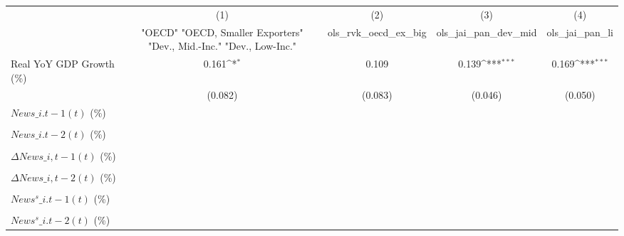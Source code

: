 {
\def\sym#1{\ifmmode^{#1}\else\(^{#1}\)\fi}
\begin{tabular}{l*{4}{c}}
\toprule
                    &\multicolumn{1}{c}{(1)}&\multicolumn{1}{c}{(2)}&\multicolumn{1}{c}{(3)}&\multicolumn{1}{c}{(4)}\\
                    &\multicolumn{1}{c}{ "OECD" "OECD, Smaller Exporters" "Dev., Mid.-Inc." "Dev., Low-Inc."}&\multicolumn{1}{c}{ols\_rvk\_oecd\_ex\_big}&\multicolumn{1}{c}{ols\_jai\_pan\_dev\_mid}&\multicolumn{1}{c}{ols\_jai\_pan\_li}\\
\midrule
Real YoY GDP Growth (\%)&       0.161\sym{*}  &       0.109         &       0.139\sym{***}&       0.169\sym{***}\\
                    &     (0.082)         &     (0.083)         &     (0.046)         &     (0.050)         \\
\addlinespace
$ News\_{i.t-1}(t)$ (\%)&                     &                     &                     &                     \\
                    &                     &                     &                     &                     \\
\addlinespace
$ News\_{i.t-2}(t)$ (\%)&                     &                     &                     &                     \\
                    &                     &                     &                     &                     \\
\addlinespace
$ \Delta News\_{i,t-1}(t)$ (\%)&                     &                     &                     &                     \\
                    &                     &                     &                     &                     \\
\addlinespace
$ \Delta News\_{i,t-2}(t)$ (\%)&                     &                     &                     &                     \\
                    &                     &                     &                     &                     \\
\addlinespace
$ News^s\_{i.t-1}(t)$ (\%)&                     &                     &                     &                     \\
                    &                     &                     &                     &                     \\
\addlinespace
$ News^s\_{i.t-2}(t)$ (\%)&                     &                     &                     &                     \\

\end{tabular}}
